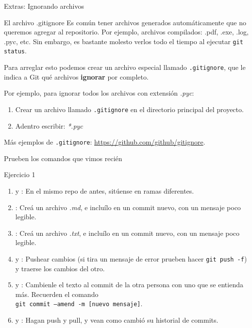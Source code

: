 \begin{frame}[t]{Extras: Ignorando archivos}

    \begin{block}{El archivo .gitignore}
      Es común tener archivos generados automáticamente que no queremos agregar al repositorio. Por ejemplo, archivos compilados: .pdf, .exe, .log, .pyc, etc. Sin embargo, es bastante molesto verlos todo el tiempo al ejecutar \texttt{git status}.

      Para arreglar esto podemos crear un archivo especial llamado \texttt{.gitignore}, que le indica a Git qué archivos \textbf{ignorar} por completo.
    \end{block}

    \pause
    \begin{resumen}{}
      Por ejemplo, para ignorar todos los archivos con extensión \textit{.pyc}:
      \begin{enumerate}
        \item Crear un archivo llamado \texttt{.gitignore} en el directorio principal del proyecto.
        \item Adentro escribir: \textit{*.pyc}
      \end{enumerate}
      Más ejemplos de \texttt{.gitignore}: \url{https://github.com/github/gitignore}.
    \end{resumen}

\end{frame}

\begin{frame}{Prueben los comandos que vimos recién}
    \begin{ejercicio}{Ejercicio 1}
    \begin{enumerate}
        \item {} y : En el mismo repo de antes, sitúense en ramas diferentes.
        \item {}: Creá un archivo \textit{.md}, e incluílo en un commit nuevo, con un mensaje poco legible.
        \item {}: Creá un archivo \textit{.txt}, e incluílo en un commit nuevo, con un mensaje poco legible.
        \item {} y : Pushear cambios (si tira un mensaje de error prueben hacer \texttt{git push -f}) y traerse los cambios del otro. 
        \item {} y : Cambienle el texto al commit de la otra persona con uno que se entienda más. 
        Recuerden el comando\\ \texttt{git commit --amend -m [nuevo mensaje]}.
        \item {} y : Hagan push y pull, y vean como cambió su historial de commits.
    \end{enumerate}
    \end{ejercicio}
\end{frame}

